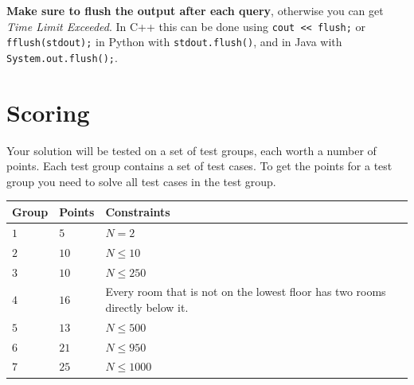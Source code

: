\textbf{Make sure to flush the output after each query}, otherwise you can get \textit{Time Limit Exceeded}.
In C++ this can be done using \texttt{cout << flush;}
or \texttt{fflush(stdout);}
in Python with \texttt{stdout.flush()},
and in Java with \texttt{System.out.flush();}.

\section*{Scoring}
Your solution will be tested on a set of test groups, each worth a number of points. Each test group contains
a set of test cases. To get the points for a test group you need to solve all test cases in the test group.


\noindent
\begin{tabular}{| l | l | p{12cm} |}
  \hline
  \textbf{Group} & \textbf{Points} & \textbf{Constraints} \\ \hline
  $1$   & $5$        & $N = 2$ \\ \hline
  $2$   & $10$        & $N \leq 10$ \\ \hline
  $3$   & $10$        & $N \leq 250$ \\ \hline
  $4$   & $16$        & Every room that is not on the lowest floor has two rooms directly below it. \\ \hline
  $5$   & $13$        & $N \leq 500$ \\ \hline
  $6$   & $21$        & $N \leq 950$ \\ \hline
  $7$   & $25$        & $N \leq 1000$ \\ \hline
\end{tabular}
